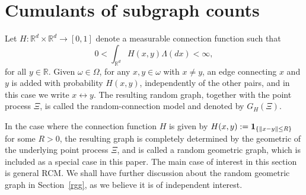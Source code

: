 \documentclass[12pt]{article}
\newcommand{\R}{\mathbb{R}}
\newcommand{\bone}{{\bf 1}}
\def\real{{\mathord{\mathbb R}}}
\numberwithin{equation}{section}
\begin{document}
\section{Cumulants of subgraph counts} %
\label{s5}
\noindent
 Let 
 $H:\R^d\times\R^d\to[0,1]$ 
 denote a %
 measurable connection function such that
 \begin{equation}
 \nonumber %
0<\int_{\real^d}H(x,y) \Lambda(dx)< \infty, 
\end{equation}
 for all $y \in\R$. 
 Given $\omega \in \Omega$, for any $x,y\in\omega$ with $x\not= y$,
 an edge connecting $x$ and $y$ is added with probability $H(x,y)$,
 independently of the other pairs, and in this case we write $x \leftrightarrow y$.
 The resulting random graph, together with the point process $\Xi$,
 is called the random-connection model and denoted by $G_H(\Xi)$.

 \medskip

 In the case where the connection function $H$ is given by $H(x,y) := \bone_{\{\|x-y\|\leq R\}}$ for some $R>0$, the resulting graph is completely determined by the geometric of the underlying point process $\Xi$, and is called a random geometric graph,
 which is included as a special case in this paper. The main case of interest in this section is general RCM. We shall have further discussion about the random geometric graph in Section~\ref{rgg}, as we believe it is of independent interest. 

\medskip
\end{document}
